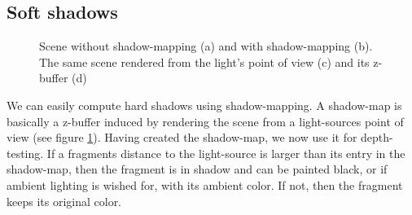 \documentclass{ACGSeminar}
\begin{document}
	\subsection{Soft shadows}
		\begin{figure}[htb!]
			\caption{Scene without shadow-mapping (a) and with shadow-mapping (b). The same scene rendered from the light's point of view (c) and its z-buffer (d)}
			\label{fig:shadow_map}%
		\end{figure}
		We can easily compute hard shadows using shadow-mapping. A shadow-map is basically a z-buffer induced by rendering the scene from a light-sources point of view (see figure \ref{fig:shadow_map}). Having created the shadow-map, we now use it for depth-testing. If a fragments distance to the light-source is larger than its entry in the shadow-map, then the fragment is in shadow and can be painted black, or if ambient lighting is wished for, with its ambient color. If not, then the fragment keeps its original color. \\\\
\end{document}
